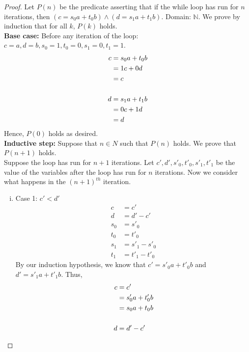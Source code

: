 \documentclass[11pt]{scrartcl}
\begin{document}
\begin{proof}
	Let $P(n)$ be the predicate asserting that if the while loop has run for $n$ iterations,
	then $(c=s_{0} a+t_{0} b) \wedge (d=s_{1} a+t_{1} b)$. 
	Domain: $\mathbb{N}$.
	We prove by induction that for all $k$, $P(k)$ holds.\\
	\textbf{Base case:} Before any iteration of the loop: $c=a, d=b, s_{0}=1, t_{0}=0, s_{1}=0, t_{1}=1$.
	\begin{align*}
		c & = s_{0} a+t_{0} b \\
		  & = 1c + 0d         \\
		  & = c               \\\-\\
		d & =s_{1} a+t_{1} b  \\
		  & = 0c + 1d         \\
		  & = d
	\end{align*}
	Hence, $P(0)$ holds as desired.\\
	\textbf{Inductive step:}
	Suppose that $n \in N$ such that $P(n)$ holds. We prove that $P(n + 1)$ holds.\\
	Suppose the loop has run for $n+ 1$ iterations. Let $c', d', s'_{0}, t'_{0}, s'_{1}, t'_{1}$
	be the value of the variables after the loop has run for $n$ iterations.
	Now we consider what happens in the $(n + 1)^{th}$ iteration.
	\begin{enumerate}[i.]
		\item{
		      Case 1: $c'<d'$
		      \begin{align*}
			      c   & = c'             \\
			      d   & = d' - c'        \\
			      s_0 & = s'_0           \\
			      t_0 & = t'_0           \\
			      s_1 & = s'_1  - s'_{0} \\
			      t_1 & = t'_1- t'_0
		      \end{align*}
		      By our induction hypothesis, we know that $c' =  s'_0 a  + t'_0b$ and $d'=s'_{1} a+t'_{1} b $. Thus,
		      \begin{align*}
			      c & =  c'                                    \\
			        & = s'_0 a  + t'_0b                        \\
			        & = s_0 a  + t_0b                          \\\-\\
			      d & = d' - c'                                \\

\end{align*}}
\end{enumerate}
\end{proof}
\end{document}
